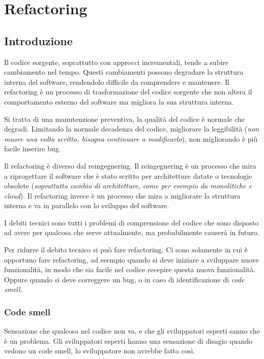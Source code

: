 \chapter{Refactoring}
\section{Introduzione}
\begin{tcolorbox}[title = Refactoring]
    Il codice sorgente, soprattutto con approcci incrementali, tende a 
    subire cambiamento nel tempo. Questi cambiamenti possono degradare 
    la struttura interna del software, rendendolo difficile da
    comprendere e mantenere. Il refactoring è un processo di
    trasformazione del codice sorgente che non altera il comportamento
    esterno del software ma migliora la sua struttura interna.
\end{tcolorbox}
Si tratta di una manutenzione preventiva, la qualità del codice è normale 
che degradi. Limitando la normale decadenza del codice, migliorare  
la leggibilità (\textit{non muore una volta scritto, bisogna 
continuare a modificarlo}), non migliorando è più facile inserire 
bug. 

Il refactoring è diverso dal reingegnering. Il reingegnering è un
processo che mira a riprogettare il software che è stato scritto
per architetture datate o tecnologie obsolete (\textit{soprattutto 
cambio di architetture, come per esempio da monolitiche e cloud}).
Il refactoring
invece è un processo che mira a migliorare la struttura interna
e va in parallelo con lo sviluppo del software.

\begin{tcolorbox}[title = Debito tecnico]
    I debiti tecnici sono tutti i problemi di comprensione del codice 
    che sono disposto ad avere per qualcosa che serve attualmente, 
    ma probabilmente causerà in futuro.
\end{tcolorbox}
Per ridurre il debito tecnico si può fare refactoring. Ci sono solamente 
in cui è opportuno fare refactoring, ad esempio quando si deve iniziare 
a sviluppare nuove funzionalità, in modo che sia facile nel codice recepire 
questa nuova funzionalità. Oppure quando si deve correggere un bug, o 
in caso di identificazione di \textit{code smell}. 
\subsection{Code smell}
Sensazione che qualcosa nel codice non va, e che gli sviluppatori
esperti sanno che è un problema. Gli sviluppatori esperti hanno 
una sensazione di disagio quando vedono un code smell, lo sviluppatore 
non avrebbe fatto così.
